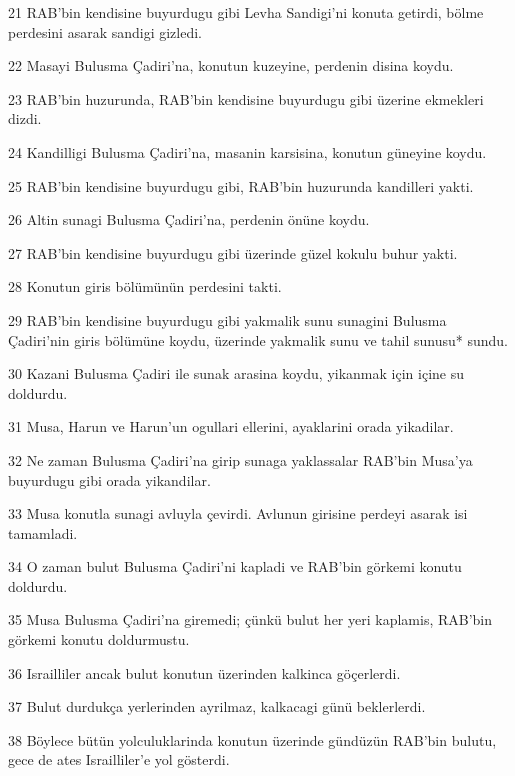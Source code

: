\par 21 RAB'bin kendisine buyurdugu gibi Levha Sandigi'ni konuta getirdi, bölme perdesini asarak sandigi gizledi.
\par 22 Masayi Bulusma Çadiri'na, konutun kuzeyine, perdenin disina koydu.
\par 23 RAB'bin huzurunda, RAB'bin kendisine buyurdugu gibi üzerine ekmekleri dizdi.
\par 24 Kandilligi Bulusma Çadiri'na, masanin karsisina, konutun güneyine koydu.
\par 25 RAB'bin kendisine buyurdugu gibi, RAB'bin huzurunda kandilleri yakti.
\par 26 Altin sunagi Bulusma Çadiri'na, perdenin önüne koydu.
\par 27 RAB'bin kendisine buyurdugu gibi üzerinde güzel kokulu buhur yakti.
\par 28 Konutun giris bölümünün perdesini takti.
\par 29 RAB'bin kendisine buyurdugu gibi yakmalik sunu sunagini Bulusma Çadiri'nin giris bölümüne koydu, üzerinde yakmalik sunu ve tahil sunusu* sundu.
\par 30 Kazani Bulusma Çadiri ile sunak arasina koydu, yikanmak için içine su doldurdu.
\par 31 Musa, Harun ve Harun'un ogullari ellerini, ayaklarini orada yikadilar.
\par 32 Ne zaman Bulusma Çadiri'na girip sunaga yaklassalar RAB'bin Musa'ya buyurdugu gibi orada yikandilar.
\par 33 Musa konutla sunagi avluyla çevirdi. Avlunun girisine perdeyi asarak isi tamamladi.
\par 34 O zaman bulut Bulusma Çadiri'ni kapladi ve RAB'bin görkemi konutu doldurdu.
\par 35 Musa Bulusma Çadiri'na giremedi; çünkü bulut her yeri kaplamis, RAB'bin görkemi konutu doldurmustu.
\par 36 Israilliler ancak bulut konutun üzerinden kalkinca göçerlerdi.
\par 37 Bulut durdukça yerlerinden ayrilmaz, kalkacagi günü beklerlerdi.
\par 38 Böylece bütün yolculuklarinda konutun üzerinde gündüzün RAB'bin bulutu, gece de ates Israilliler'e yol gösterdi.


